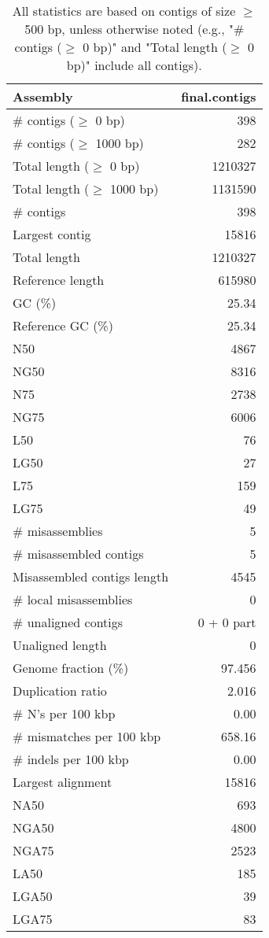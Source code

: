 \documentclass[12pt,a4paper]{article}
\begin{document}
\begin{table}[ht]
\begin{center}
\caption{All statistics are based on contigs of size $\geq$ 500 bp, unless otherwise noted (e.g., "\# contigs ($\geq$ 0 bp)" and "Total length ($\geq$ 0 bp)" include all contigs).}
\begin{tabular}{|l*{1}{|r}|}
\hline
Assembly & final.contigs \\ \hline
\# contigs ($\geq$ 0 bp) & 398 \\ \hline
\# contigs ($\geq$ 1000 bp) & 282 \\ \hline
Total length ($\geq$ 0 bp) & 1210327 \\ \hline
Total length ($\geq$ 1000 bp) & 1131590 \\ \hline
\# contigs & 398 \\ \hline
Largest contig & 15816 \\ \hline
Total length & 1210327 \\ \hline
Reference length & 615980 \\ \hline
GC (\%) & 25.34 \\ \hline
Reference GC (\%) & 25.34 \\ \hline
N50 & 4867 \\ \hline
NG50 & 8316 \\ \hline
N75 & 2738 \\ \hline
NG75 & 6006 \\ \hline
L50 & 76 \\ \hline
LG50 & 27 \\ \hline
L75 & 159 \\ \hline
LG75 & 49 \\ \hline
\# misassemblies & 5 \\ \hline
\# misassembled contigs & 5 \\ \hline
Misassembled contigs length & 4545 \\ \hline
\# local misassemblies & 0 \\ \hline
\# unaligned contigs & 0 + 0 part \\ \hline
Unaligned length & 0 \\ \hline
Genome fraction (\%) & 97.456 \\ \hline
Duplication ratio & 2.016 \\ \hline
\# N's per 100 kbp & 0.00 \\ \hline
\# mismatches per 100 kbp & 658.16 \\ \hline
\# indels per 100 kbp & 0.00 \\ \hline
Largest alignment & 15816 \\ \hline
NA50 & 693 \\ \hline
NGA50 & 4800 \\ \hline
NGA75 & 2523 \\ \hline
LA50 & 185 \\ \hline
LGA50 & 39 \\ \hline
LGA75 & 83 \\ \hline
\end{tabular}
\end{center}
\end{table}
\end{document}
